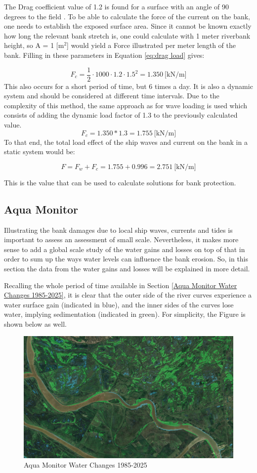 The Drag coefficient value of 1.2 is found for a surface with an angle of 90 degrees to the field \autocite{chhabrarajendraprasadDragCoefficientOverview}.
To be able to calculate the force of the current on the bank, one needs to establish the exposed surface area. Since it cannot be known exactly how long the relevant bank stretch is, one could calculate with 1 meter riverbank height, so A = 1 [m$^2$] would yield a Force illustrated per meter length of the bank. Filling in these parameters in Equation \ref{eq:drag load} gives:

$$
F_c = \frac{1}{2} \cdot 1000 \cdot 1.2 \cdot 1.5^2 = 1.350 ~\text{[kN/m]}
$$
This also occurs for a short period of time, but 6 times a day. It is also a dynamic system and should be considered at different time intervals. Due to the complexity of this method, the same approach as for wave loading is used which consists of adding the dynamic load factor of 1.3 to the previously calculated value. 
$$
F_c = 1.350 * 1.3 = 1.755 ~\text{[kN/m]}
$$
To that end, the total load effect of the ship waves and current on the bank in a static system would be:

$$
F = F_w + F_c = 1.755 + 0.996 = 2.751 ~\text{[kN/m]}
$$

This is the value that can be used to calculate solutions for bank protection. 


\subsection{Aqua Monitor}
\label{section:cirtical_location}
Illustrating the bank damages due to local ship waves, currents and tides is important to assess an assessment of small scale. Nevertheless, it makes more sense to add a global scale study of the water gains and losses on top of that in order to sum up the ways water levels can influence the bank erosion. So, in this section the data from the water gains and losses will be explained in more detail. 

Recalling the whole period of time available in Section \ref{Aqua Monitor Water Changes 1985-2025}, it is clear that the outer side of the river curves experience a water surface gain (indicated in blue), and the inner sides of the curves lose water, implying sedimentation (indicated in green). For simplicity, the Figure is shown below as well.

\begin{figure}[H]
    \centering
    \includegraphics[width=0.75\linewidth]{figures/ch4/1985-2025.jpg}
    \caption{Aqua Monitor Water Changes 1985-2025}
\end{figure}
\label{Aqua Monitor Water Changes 1985-2025.2}

